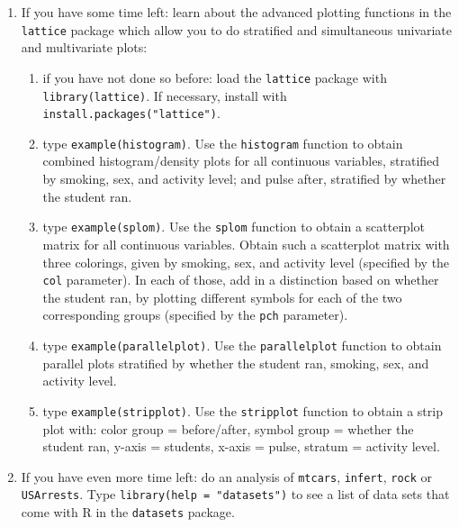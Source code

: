 \begin{enumerate}
\item If you have some time left: learn about the advanced plotting functions in the \texttt{lattice} package which allow you to do stratified and simultaneous univariate and multivariate plots:
    \begin{enumerate}
    \item if you have not done so before: load the \texttt{lattice} package with \texttt{library(lattice)}. If necessary, install with \texttt{install.packages("lattice")}.
    \item type \texttt{example(histogram)}. Use the \texttt{histogram} function to obtain combined histogram/density plots for all continuous variables, stratified by smoking, sex, and activity level; and pulse after, stratified by whether the student ran.
    \item type \texttt{example(splom)}. Use the \texttt{splom} function to obtain a scatterplot matrix for all continuous variables. Obtain such a scatterplot matrix with three colorings, given by smoking, sex, and activity level (specified by the \texttt{col} parameter). In each of those, add in a distinction based on whether the student ran, by plotting different symbols for each of the two corresponding groups (specified by the \texttt{pch} parameter).
    \item type \texttt{example(parallelplot)}. Use the \texttt{parallelplot} function to obtain parallel plots stratified by whether the student ran, smoking, sex, and activity level.
    \item type \texttt{example(stripplot)}. Use the \texttt{stripplot} function to obtain a strip plot with: color group = before/after, symbol group = whether the student ran, y-axis = students, x-axis = pulse, stratum = activity level.
    \end{enumerate}
    
\item If you have even more time left: do an analysis of \texttt{mtcars}, \texttt{infert}, \texttt{rock} or \texttt{USArrests}. Type \texttt{library(help = "datasets")} to see a list of data sets that come with R in the \texttt{datasets} package.


\end{enumerate}
